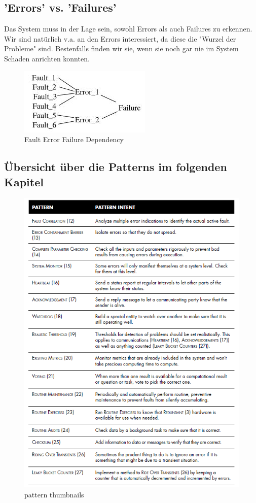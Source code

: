 \subsection*{'Errors' vs. 'Failures'}


Das System muss in der Lage sein, sowohl Errors als auch Failures zu erkennen. Wir sind natürlich v.a. an den Errors interessiert, da diese die "Wurzel der Probleme" sind. Bestenfalls finden wir sie, wenn sie noch gar nie im System Schaden anrichten konnten.

\begin{figure}[H]
	\centering
	\includegraphics{content/faulttolerance/images/FaultErrorFailureDependency.JPG}
	\caption{Fault Error Failure Dependency}
\end{figure}


\subsection*{Übersicht über die Patterns im folgenden Kapitel}


\begin{figure}
	\centering
	\includegraphics{content/faulttolerance/images/pattern_thumbnails.png}
	\caption{pattern thumbnails}
\end{figure}


